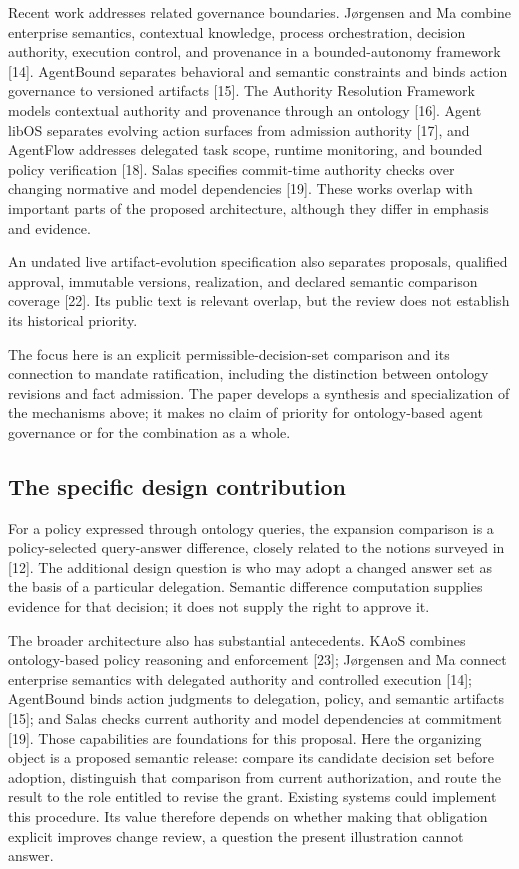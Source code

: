 \documentclass[
  english,
  12pt,
  a4paper,
  preprint,
  numbers,
  nopreprintline]{elsarticle}
\begin{document}
Recent work addresses related governance boundaries. Jørgensen and Ma
combine enterprise semantics, contextual knowledge, process
orchestration, decision authority, execution control, and provenance in
a bounded-autonomy framework {[}14{]}. AgentBound separates behavioral
and semantic constraints and binds action governance to versioned
artifacts {[}15{]}. The Authority Resolution Framework models contextual
authority and provenance through an ontology {[}16{]}. Agent libOS
separates evolving action surfaces from admission authority {[}17{]},
and AgentFlow addresses delegated task scope, runtime monitoring, and
bounded policy verification {[}18{]}. Salas specifies commit-time
authority checks over changing normative and model dependencies
{[}19{]}. These works overlap with important parts of the proposed
architecture, although they differ in emphasis and evidence.

An undated live artifact-evolution specification also separates
proposals, qualified approval, immutable versions, realization, and
declared semantic comparison coverage {[}22{]}. Its public text is
relevant overlap, but the review does not establish its historical
priority.

The focus here is an explicit permissible-decision-set comparison and
its connection to mandate ratification, including the distinction
between ontology revisions and fact admission. The paper develops a
synthesis and specialization of the mechanisms above; it makes no claim
of priority for ontology-based agent governance or for the combination
as a whole.

\subsection{The specific design
contribution}\label{the-specific-design-contribution}

For a policy expressed through ontology queries, the expansion
comparison is a policy-selected query-answer difference, closely related
to the notions surveyed in {[}12{]}. The additional design question is
who may adopt a changed answer set as the basis of a particular
delegation. Semantic difference computation supplies evidence for that
decision; it does not supply the right to approve it.

The broader architecture also has substantial antecedents. KAoS combines
ontology-based policy reasoning and enforcement {[}23{]}; Jørgensen and
Ma connect enterprise semantics with delegated authority and controlled
execution {[}14{]}; AgentBound binds action judgments to delegation,
policy, and semantic artifacts {[}15{]}; and Salas checks current
authority and model dependencies at commitment {[}19{]}. Those
capabilities are foundations for this proposal. Here the organizing
object is a proposed semantic release: compare its candidate decision
set before adoption, distinguish that comparison from current
authorization, and route the result to the role entitled to revise the
grant. Existing systems could implement this procedure. Its value
therefore depends on whether making that obligation explicit improves
change review, a question the present illustration cannot answer.
\end{document}

